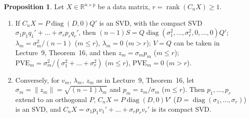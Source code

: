 \documentclass[12pt]{article}
\newcommand{\R}{\mathbb R}
\DeclareMathOperator{\diag}{diag}
\DeclareMathOperator{\rank}{rank}
\theoremstyle{definition}
\newtheorem{proposition}[theorem]{Proposition}
\newcommand{\lec}[1]{Lecture~#1}
\begin{document}
\begin{proposition}\label{b15.19}
Let \(X\in\R^{n\times p}\) be a data matrix, \(r=\rank(C_nX)\geqslant1\).
\begin{enumerate}
\item If \(C_nX=P\diag(D,0)Q'\) is an SVD, with the compact SVD \(\sigma_1p_1q_1'+\dots+\sigma_rp_rq_r'\), then
\((n-1)S=Q\diag(\sigma_1^2,\dots,\sigma_r^2,0,\dots,0)Q'\); \(\lambda_m=\sigma_m^2/(n-1)\) (\(m\leqslant r\)),
\(\lambda_m=0\) (\(m>r\)); \(V=Q\) can be taken in \lec{9}, Theorem~16, and then \(z_m=\sigma_mp_m\) (\(m\leqslant r\));
\(\mathrm{PVE}_m=\sigma_m^2/(\sigma_1^2+\dots+\sigma_r^2)\) (\(m\leqslant r\)), \(\mathrm{PVE}_m=0\) (\(m>r\)).
\item Conversely, for \(v_m\), \(\lambda_m\), \(z_m\) as in \lec{9}, Theorem~16, let \(\sigma_m=\lVert z_m\rVert=\sqrt{(n-1)\lambda_m}\)
and \(p_m=z_m/\sigma_m\) (\(m\leqslant r\)). Then \(p_1,\dots,p_r\) extend to an orthogonal \(P\),
\(C_nX=P\diag(D,0)V'\) (\(D=\diag(\sigma_1,\dots,\sigma_r)\)) is an SVD, and
\(C_nX=\sigma_1p_1v_1'+\dots+\sigma_rp_rv_r'\) is its compact SVD.
\end{enumerate}
\end{proposition}
\end{document}
